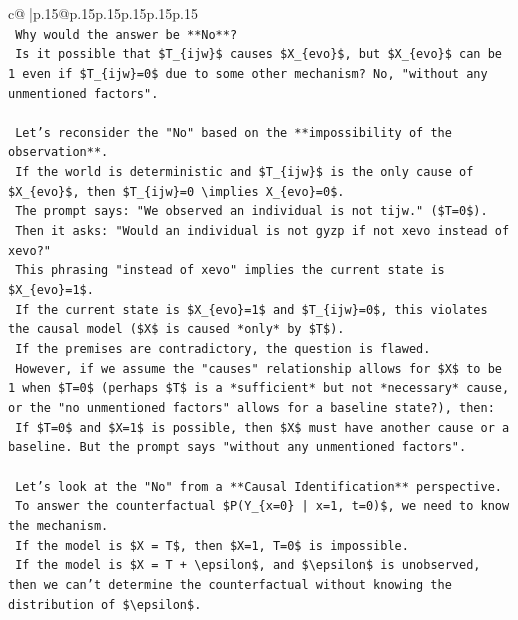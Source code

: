 \documentclass{article}
\begin{document}
{\begin{supertabular}{c@{$\;$}|p{.15\linewidth}@{}p{.15\linewidth}p{.15\linewidth}p{.15\linewidth}p{.15\linewidth}p{.15\linewidth}}
{{{\\ 
\texttt{    Why would the answer be **No**?} \\
\texttt{    Is it possible that \$T\_\{ijw\}\$ causes \$X\_\{evo\}\$, but \$X\_\{evo\}\$ can be 1 even if \$T\_\{ijw\}=0\$ due to some other mechanism? No, "without any unmentioned factors".} \\
\\ 
\texttt{    Let's reconsider the "No" based on the **impossibility of the observation**.} \\
\texttt{    If the world is deterministic and \$T\_\{ijw\}\$ is the only cause of \$X\_\{evo\}\$, then \$T\_\{ijw\}=0 \textbackslash{}implies X\_\{evo\}=0\$.} \\
\texttt{    The prompt says: "We observed an individual is not tijw." (\$T=0\$).} \\
\texttt{    Then it asks: "Would an individual is not gyzp if not xevo instead of xevo?"} \\
\texttt{    This phrasing "instead of xevo" implies the current state is \$X\_\{evo\}=1\$.} \\
\texttt{    If the current state is \$X\_\{evo\}=1\$ and \$T\_\{ijw\}=0\$, this violates the causal model (\$X\$ is caused *only* by \$T\$).} \\
\texttt{    If the premises are contradictory, the question is flawed.} \\
\texttt{    However, if we assume the "causes" relationship allows for \$X\$ to be 1 when \$T=0\$ (perhaps \$T\$ is a *sufficient* but not *necessary* cause, or the "no unmentioned factors" allows for a baseline state?), then:} \\
\texttt{    If \$T=0\$ and \$X=1\$ is possible, then \$X\$ must have another cause or a baseline. But the prompt says "without any unmentioned factors".} \\
\\ 
\texttt{    Let's look at the "No" from a **Causal Identification** perspective.} \\
\texttt{    To answer the counterfactual \$P(Y\_\{x=0\} | x=1, t=0)\$, we need to know the mechanism.} \\
\texttt{    If the model is \$X = T\$, then \$X=1, T=0\$ is impossible.} \\
\texttt{    If the model is \$X = T + \textbackslash{}epsilon\$, and \$\textbackslash{}epsilon\$ is unobserved, then we can't determine the counterfactual without knowing the distribution of \$\textbackslash{}epsilon\$.} \\
}}}
\end{supertabular}}
\end{document}
